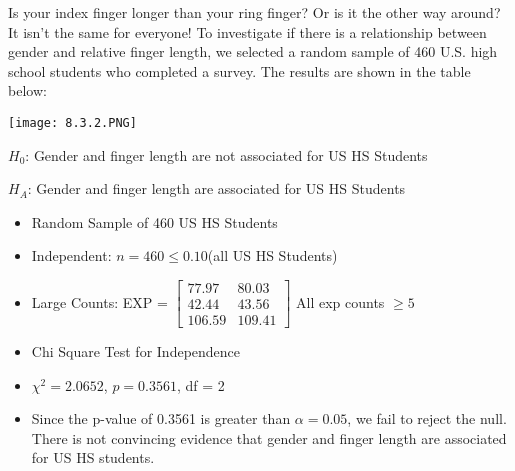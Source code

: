 \documentclass[../stats.tex]{subfiles}
\begin{document}
\pagebreak
\begin{example}
    Is your index finger longer than your ring finger? Or is it the other way around? It isn't the same for everyone! To investigate if there is a relationship between gender and relative finger length, we selected a random sample of 460 U.S. high school students who completed a survey. The results are shown in the table below:
    
    \begin{center}
        \texttt{[image: 8.3.2.PNG]}
    \end{center}

    $H_0$: Gender and finger length are not associated for US HS Students 

    $H_A$: Gender and finger length are associated for US HS Students 

    \begin{itemize}
        \item Random Sample of 460 US HS Students 
        \item Independent: $n=460\leq 0.10$(all US HS Students)
        \item Large Counts: EXP = $\begin{bmatrix}
            77.97 & 80.03 \\
            42.44 & 43.56 \\
            106.59 & 109.41
        \end{bmatrix}$ All exp counts $\geq 5$
        \item Chi Square Test for Independence
        \item $\chi^2=2.0652$, $p=0.3561$, df = 2
        \item Since the p-value of 0.3561 is greater than $\alpha = 0.05$, we fail to reject the null. There is not convincing evidence that gender and finger length are associated for US HS students.
    \end{itemize}
\end{example}
\end{document}
